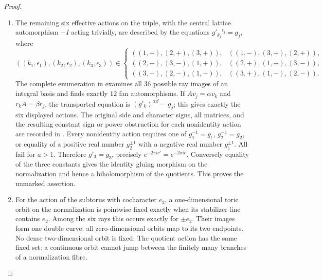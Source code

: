 \begin{proof}
\begin{enumerate}[label=\arabic*.,leftmargin=*]
\item The remaining six effective actions on the triple, with the central
lattice automorphism \(-I\) acting trivially, are described by the equations
\(g'_{k_j}{}^{\epsilon_j}=g_j\), where
\[
 ((k_1,\epsilon_1),(k_2,\epsilon_2),(k_3,\epsilon_3))
 \in\left\{
\begin{array}{lll}
((1,+),(2,+),(3,+)),&((1,-),(3,+),(2,+)),\\
((2,-),(3,-),(1,+)),&((2,+),(1,+),(3,-)),\\
((3,-),(2,-),(1,-)),&((3,+),(1,-),(2,-)).
\end{array}\right.
\]
The complete enumeration in
examines all $36$ possible ray images of an integral basis and finds exactly
$12$ fan automorphisms. If $Av_j=\alpha v_k$ and $r_kA=\beta r_j$, the
transported equation is $(g'_k)^{\alpha\beta}=g_j$; this gives exactly the
six displayed actions. The original side and character signs, all matrices,
and the resulting constant sign or power obstruction for each nonidentity
action are recorded in .
Every nonidentity action requires one of
\(g_1^{-1}=g_1\), \(g_2^{-1}=g_2\), or equality of a positive real number
\(g_2^{\pm1}\) with a negative real number \(g_1^{\pm1}\).
All fail for \(a>1\). Therefore \(g'_3=g_3\), precisely
\(e^{-2\pi ic'}=e^{-2\pi ic}\). Conversely equality of the three constants
gives the identity gluing morphism on the normalization and hence a
biholomorphism of the quotients. This proves the unmarked assertion.

\item For the action of the subtorus with cocharacter \(e_2\), a one-dimensional
toric orbit on the normalization is pointwise fixed exactly when its
stabilizer line contains \(e_2\). Among the six rays this occurs exactly
for \(\pm e_2\). Their images form one double curve; all zero-dimensional
orbits map to its two endpoints. No dense two-dimensional orbit is fixed.
The quotient action has the same fixed set: a continuous orbit cannot
jump between the finitely many branches of a normalization fibre.
\end{enumerate}
\end{proof}



